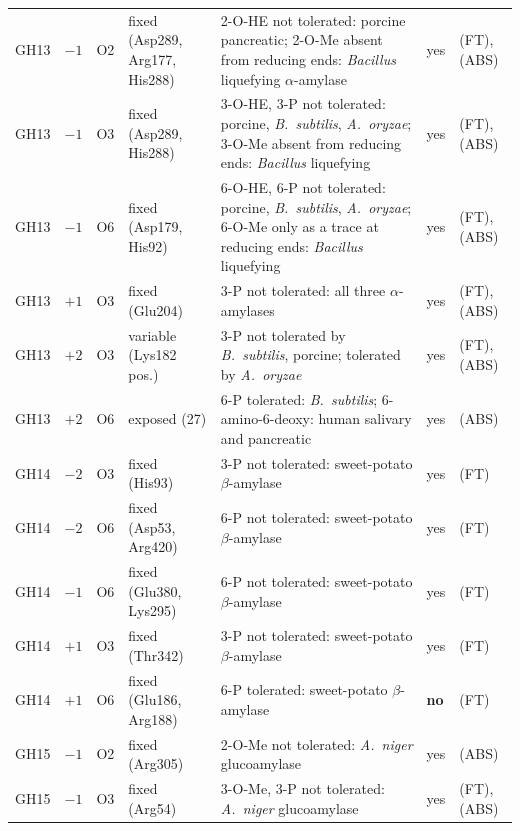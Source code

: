 \documentclass[preprint,12pt]{elsarticle}
\begin{document}
\begin{landscape}
{\begin{longtable}{lllp{3.3cm}p{6.8cm}lp{3.8cm}}
GH13 & $-1$ & O2 & fixed (Asp289, Arg177, His288) & 2-O-HE not tolerated: porcine pancreatic; 2-O-Me absent from reducing ends: \emph{Bacillus} liquefying $\alpha$-amylase & yes & \citep{vanderBurgt1998} (FT), \citep{Yoshida1984} (ABS)\\
GH13 & $-1$ & O3 & fixed (Asp289, His288) & 3-O-HE, 3-P not tolerated: porcine, \emph{B.~subtilis}, \emph{A.~oryzae}; 3-O-Me absent from reducing ends: \emph{Bacillus} liquefying & yes & \citep{Takeda1987,vanderBurgt1998} (FT), \citep{Yoshida1984,Takeda1983} (ABS)\\
GH13 & $-1$ & O6 & fixed (Asp179, His92) & 6-O-HE, 6-P not tolerated: porcine, \emph{B.~subtilis}, \emph{A.~oryzae}; 6-O-Me only as a trace at reducing ends: \emph{Bacillus} liquefying & yes & \citep{Takeda1987,vanderBurgt1998} (FT), \citep{Yoshida1984,Takeda1983} (ABS)\\
GH13 & $+1$ & O3 & fixed (Glu204) & 3-P not tolerated: all three $\alpha$-amylases & yes & \citep{Takeda1987} (FT), \citep{Takeda1983} (ABS)\\
GH13 & $+2$ & O3 & variable (Lys182 pos.) & 3-P not tolerated by \emph{B.~subtilis}, porcine; tolerated by \emph{A.~oryzae} & yes & \citep{Takeda1987} (FT), \citep{Takeda1983,TakedaHizukuri1986} (ABS)\\
GH13 & $+2$ & O6 & exposed (27) & 6-P tolerated: \emph{B.~subtilis}; 6-amino-6-deoxy: human salivary and pancreatic & yes & \citep{Takeda1983,Omichi1992} (ABS)\\
\addlinespace
GH14 & $-2$ & O3 & fixed (His93) & 3-P not tolerated: sweet-potato $\beta$-amylase & yes & \citep{Takeda1987} (FT)\\
GH14 & $-2$ & O6 & fixed (Asp53, Arg420) & 6-P not tolerated: sweet-potato $\beta$-amylase & yes & \citep{Takeda1987} (FT)\\
GH14 & $-1$ & O6 & fixed (Glu380, Lys295) & 6-P not tolerated: sweet-potato $\beta$-amylase & yes & \citep{Takeda1987} (FT)\\
GH14 & $+1$ & O3 & fixed (Thr342) & 3-P not tolerated: sweet-potato $\beta$-amylase & yes & \citep{Takeda1987} (FT)\\
GH14 & $+1$ & O6 & fixed (Glu186, Arg188) & 6-P tolerated: sweet-potato $\beta$-amylase & \textbf{no} & \citep{Takeda1987} (FT)\\
\addlinespace
GH15 & $-1$ & O2 & fixed (Arg305) & 2-O-Me not tolerated: \emph{A.~niger} glucoamylase & yes & \citep{Lemieux1996} (ABS)\\
GH15 & $-1$ & O3 & fixed (Arg54) & 3-O-Me, 3-P not tolerated: \emph{A.~niger} glucoamylase & yes & \citep{Takeda1987} (FT), \citep{Lemieux1996,Takeda1983} (ABS)\\

\end{longtable}}
\end{landscape}
\end{document}
